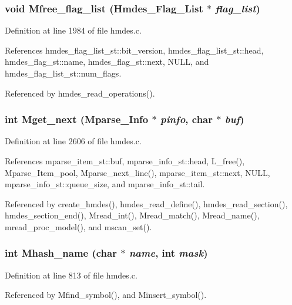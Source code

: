 \subsubsection{\setlength{\rightskip}{0pt plus 5cm}void Mfree\_\-flag\_\-list (\bf{Hmdes\_\-Flag\_\-List} $\ast$ {\em flag\_\-list})}\label{hmdes_8h_a12ab0bf2d586730b3c3248f688921af}




Definition at line 1984 of file hmdes.c.

References hmdes\_\-flag\_\-list\_\-st::bit\_\-version, hmdes\_\-flag\_\-list\_\-st::head, hmdes\_\-flag\_\-st::name, hmdes\_\-flag\_\-st::next, NULL, and hmdes\_\-flag\_\-list\_\-st::num\_\-flags.

Referenced by hmdes\_\-read\_\-operations().
\subsubsection{\setlength{\rightskip}{0pt plus 5cm}int Mget\_\-next (\bf{Mparse\_\-Info} $\ast$ {\em pinfo}, char $\ast$ {\em buf})}\label{hmdes_8h_3048440efa1af4a82f688116e0e0c54b}




Definition at line 2606 of file hmdes.c.

References mparse\_\-item\_\-st::buf, mparse\_\-info\_\-st::head, L\_\-free(), Mparse\_\-Item\_\-pool, Mparse\_\-next\_\-line(), mparse\_\-item\_\-st::next, NULL, mparse\_\-info\_\-st::queue\_\-size, and mparse\_\-info\_\-st::tail.

Referenced by create\_\-hmdes(), hmdes\_\-read\_\-define(), hmdes\_\-read\_\-section(), hmdes\_\-section\_\-end(), Mread\_\-int(), Mread\_\-match(), Mread\_\-name(), mread\_\-proc\_\-model(), and mscan\_\-set().
\subsubsection{\setlength{\rightskip}{0pt plus 5cm}int Mhash\_\-name (char $\ast$ {\em name}, int {\em mask})}\label{hmdes_8h_bd9725ae2e255beb2f27b69261855d05}




Definition at line 813 of file hmdes.c.

Referenced by Mfind\_\-symbol(), and Minsert\_\-symbol().
